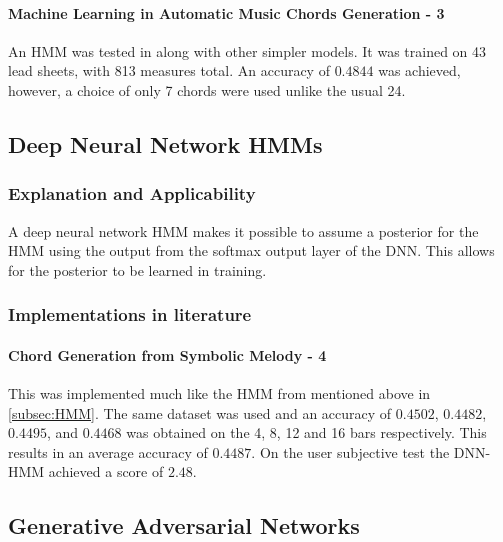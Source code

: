 \paragraph{Machine Learning in Automatic Music Chords Generation - 3} An HMM was tested in  along with other simpler models. It was trained on 43 lead sheets, with 813 measures total. 
An accuracy of $0.4844$ was achieved, however, a choice of only 7 chords were used unlike the usual 24.


\subsection{Deep Neural Network HMMs}

\label{subsec:DNN-HMMs}
\subsubsection{Explanation and Applicability} 

A deep neural network HMM makes it possible to assume a posterior for the HMM using the output from the softmax output layer of the DNN. 
This allows for the posterior to be learned in training.

\subsubsection{Implementations in literature}

\paragraph{Chord Generation from Symbolic Melody - 4} This was implemented much like the HMM from  mentioned above in \cref{subsec:HMM}.
The same dataset was used and an accuracy of $0.4502$, $0.4482$, $0.4495$, and $0.4468$  was obtained on the 4, 8, 12 and 16 bars respectively. This results in an average accuracy of $0.4487$.
On the user subjective test the DNN-HMM achieved a score of $2.48$.

\subsection{Generative Adversarial Networks}

